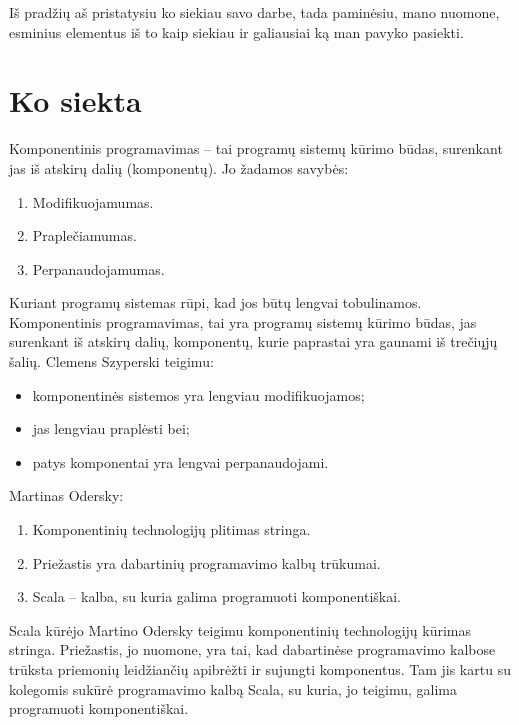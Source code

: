 \begin{handout}
  Iš pradžių aš pristatysiu ko siekiau savo darbe, tada paminėsiu,
  mano nuomone, esminius elementus iš to kaip siekiau ir galiausiai
  ką man pavyko pasiekti.
\end{handout}

\section{Ko siekta}

\begin{frame}
  Komponentinis programavimas – tai programų sistemų kūrimo būdas,
  surenkant jas iš atskirų dalių (komponentų). Jo žadamos savybės:
  \begin{enumerate}
    \item Modifikuojamumas.
    \item Praplečiamumas.
    \item Perpanaudojamumas.
  \end{enumerate}
  \begin{handout}
    Kuriant programų sistemas rūpi, kad jos būtų lengvai tobulinamos.
    Komponentinis programavimas, tai yra programų sistemų kūrimo
    būdas, jas surenkant iš atskirų dalių, komponentų, kurie
    paprastai yra gaunami iš trečiųjų šalių. Clemens Szyperski
    teigimu:
    \begin{itemize}
      \item komponentinės sistemos yra lengviau modifikuojamos;
      \item jas lengviau praplėsti bei;
      \item patys komponentai yra lengvai perpanaudojami.
    \end{itemize}
  \end{handout}
\end{frame}

\begin{frame}
  Martinas Odersky:
  \begin{enumerate}
    \item Komponentinių technologijų plitimas stringa.
    \item Priežastis yra dabartinių programavimo kalbų trūkumai.
    \item Scala – kalba, su kuria galima programuoti komponentiškai.
  \end{enumerate}
  \begin{handout}
    Scala kūrėjo Martino Odersky teigimu komponentinių technologijų
    kūrimas stringa. Priežastis, jo nuomone, yra tai, kad dabartinėse
    programavimo kalbose trūksta priemonių leidžiančių apibrėžti
    ir sujungti komponentus. Tam jis kartu su kolegomis sukūrė
    programavimo kalbą Scala, su kuria, jo teigimu, galima
    programuoti komponentiškai.
  \end{handout}
\end{frame}

